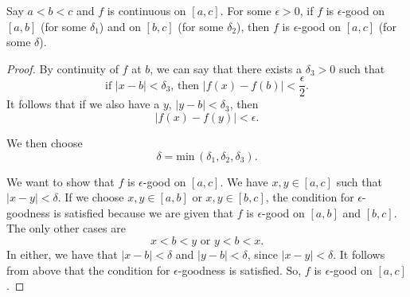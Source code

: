 \begin{lemma} \label{uniconlem}
Say $a < b < c$ and $f$ is continuous on $[a, c]$. For some $\epsilon > 0$, if $f$ is $\epsilon$-good on $[a, b]$ (for some $\delta_1$) and on $[b, c]$ (for some $\delta_2$), then $f$ is $\epsilon$-good on $[a, c]$ (for some $\delta$). 

\begin{proof}
By continuity of $f$ at $b$, we can say that there exists a $\delta_3 > 0$ such that
\[ \textrm{if } |x - b| < \delta_3 \textrm{, then } |f(x) - f(b)| < \frac\epsilon2. \]
It follows that if we also have a $y$, $|y - b| < \delta_3$, then
\[ |f(x) - f(y)| < \epsilon. \]

We then choose
\[ \delta = \textrm{min}\,(\delta_1, \delta_2, \delta_3). \]

We want to show that $f$ is $\epsilon$-good on $[a, c]$. We have $x, y \in [a, c]$ such that $|x - y| < \delta$. If we choose $x, y \in [a, b]$ or $x, y \in [b, c]$, the condition for $\epsilon$-goodness is satisfied because we are given that $f$ is $\epsilon$-good on $[a, b]$ and $[b, c]$. The only other cases are 
\[ x < b < y \textrm{ or } y < b < x. \]
In either, we have that $|x - b| < \delta$ and $|y - b| < \delta$, since $|x - y| < \delta$. It follows from above that the condition for $\epsilon$-goodness is satisfied. So, $f$ is $\epsilon$-good on $[a, c]$.
\end{proof}
\end{lemma}


